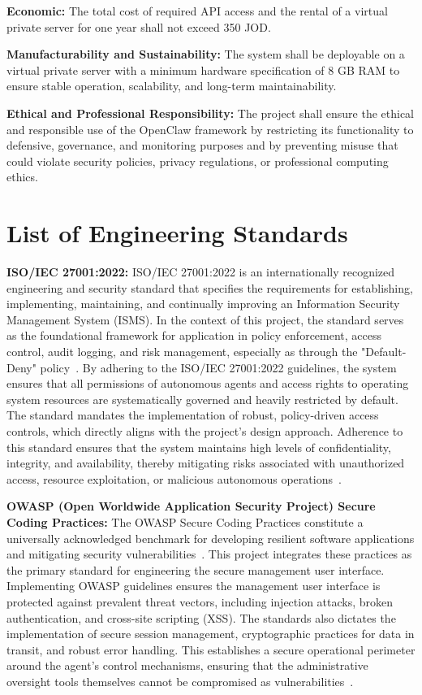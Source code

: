 \documentclass[a4paper]{report}
\begin{document}
    \item \textbf{Economic:} The total cost of required API access and the rental of a virtual private server for one year shall not exceed 350 JOD.
    \item \textbf{Manufacturability and Sustainability:} The system shall be deployable on a virtual private server with a minimum hardware specification of 8 GB RAM to ensure stable operation, scalability, and long-term maintainability.
    \item \textbf{Ethical and Professional Responsibility:} The project shall ensure the ethical and responsible use of the OpenClaw framework by restricting its functionality to defensive, governance, and monitoring purposes and by preventing misuse that could violate security policies, privacy regulations, or professional computing ethics.

\section{List of Engineering Standards}
\item {\textbf{ISO/IEC 27001:2022:}}
    ISO/IEC 27001:2022 is an internationally recognized engineering and security standard that specifies the requirements for establishing, implementing, maintaining, and continually improving an Information Security Management System (ISMS). In the context of this project, the standard serves as the foundational framework for application in policy enforcement, access control, audit logging, and risk management, especially as through the "Default-Deny" policy~\cite{anonymous2026four}. By adhering to the ISO/IEC 27001:2022 guidelines, the system ensures that all permissions of autonomous agents and access rights to operating system resources are systematically governed and heavily restricted by default. The standard mandates the implementation of robust, policy-driven access controls, which directly aligns with the project's design approach. Adherence to this standard ensures that the system maintains high levels of confidentiality, integrity, and availability, thereby mitigating risks associated with unauthorized access, resource exploitation, or malicious autonomous operations~\cite{anonymous2026framework}.


    \item {\textbf{OWASP (Open Worldwide Application Security Project) Secure Coding Practices:}}
    The OWASP Secure Coding Practices constitute a universally acknowledged benchmark for developing resilient software applications and mitigating security vulnerabilities~\cite{gong2025secure}. This project integrates these practices as the primary standard for engineering the secure management user interface. Implementing OWASP guidelines ensures the management user interface is protected against prevalent threat vectors, including injection attacks, broken authentication, and cross-site scripting (XSS). The standards also dictates the implementation of secure session management, cryptographic practices for data in transit, and robust error handling. This establishes a secure operational perimeter around the agent's control mechanisms, ensuring that the administrative oversight tools themselves cannot be compromised as vulnerabilities~\cite{ying2026uncovering}.
\end{document}
